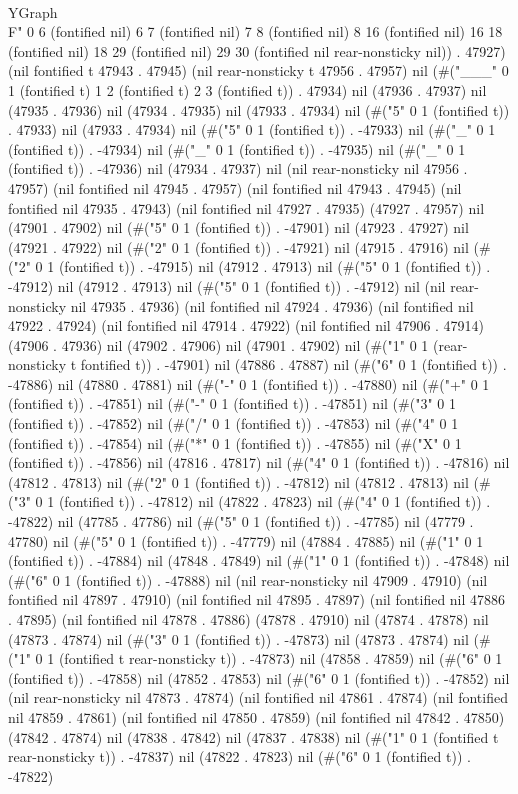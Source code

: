    \\YGraph\\F" 0 6 (fontified nil) 6 7 (fontified nil) 7 8 (fontified nil) 8 16 (fontified nil) 16 18 (fontified nil) 18 29 (fontified nil) 29 30 (fontified nil rear-nonsticky nil)) . 47927) (nil fontified t 47943 . 47945) (nil rear-nonsticky t 47956 . 47957) nil (#("___" 0 1 (fontified t) 1 2 (fontified t) 2 3 (fontified t)) . 47934) nil (47936 . 47937) nil (47935 . 47936) nil (47934 . 47935) nil (47933 . 47934) nil (#("5" 0 1 (fontified t)) . 47933) nil (47933 . 47934) nil (#("5" 0 1 (fontified t)) . -47933) nil (#("_" 0 1 (fontified t)) . -47934) nil (#("_" 0 1 (fontified t)) . -47935) nil (#("_" 0 1 (fontified t)) . -47936) nil (47934 . 47937) nil (nil rear-nonsticky nil 47956 . 47957) (nil fontified nil 47945 . 47957) (nil fontified nil 47943 . 47945) (nil fontified nil 47935 . 47943) (nil fontified nil 47927 . 47935) (47927 . 47957) nil (47901 . 47902) nil (#("5" 0 1 (fontified t)) . -47901) nil (47923 . 47927) nil (47921 . 47922) nil (#("2" 0 1 (fontified t)) . -47921) nil (47915 . 47916) nil (#("2" 0 1 (fontified t)) . -47915) nil (47912 . 47913) nil (#("5" 0 1 (fontified t)) . -47912) nil (47912 . 47913) nil (#("5" 0 1 (fontified t)) . -47912) nil (nil rear-nonsticky nil 47935 . 47936) (nil fontified nil 47924 . 47936) (nil fontified nil 47922 . 47924) (nil fontified nil 47914 . 47922) (nil fontified nil 47906 . 47914) (47906 . 47936) nil (47902 . 47906) nil (47901 . 47902) nil (#("1" 0 1 (rear-nonsticky t fontified t)) . -47901) nil (47886 . 47887) nil (#("6" 0 1 (fontified t)) . -47886) nil (47880 . 47881) nil (#("-" 0 1 (fontified t)) . -47880) nil (#("+" 0 1 (fontified t)) . -47851) nil (#("-" 0 1 (fontified t)) . -47851) nil (#("3" 0 1 (fontified t)) . -47852) nil (#("/" 0 1 (fontified t)) . -47853) nil (#("4" 0 1 (fontified t)) . -47854) nil (#("*" 0 1 (fontified t)) . -47855) nil (#("X" 0 1 (fontified t)) . -47856) nil (47816 . 47817) nil (#("4" 0 1 (fontified t)) . -47816) nil (47812 . 47813) nil (#("2" 0 1 (fontified t)) . -47812) nil (47812 . 47813) nil (#("3" 0 1 (fontified t)) . -47812) nil (47822 . 47823) nil (#("4" 0 1 (fontified t)) . -47822) nil (47785 . 47786) nil (#("5" 0 1 (fontified t)) . -47785) nil (47779 . 47780) nil (#("5" 0 1 (fontified t)) . -47779) nil (47884 . 47885) nil (#("1" 0 1 (fontified t)) . -47884) nil (47848 . 47849) nil (#("1" 0 1 (fontified t)) . -47848) nil (#("6" 0 1 (fontified t)) . -47888) nil (nil rear-nonsticky nil 47909 . 47910) (nil fontified nil 47897 . 47910) (nil fontified nil 47895 . 47897) (nil fontified nil 47886 . 47895) (nil fontified nil 47878 . 47886) (47878 . 47910) nil (47874 . 47878) nil (47873 . 47874) nil (#("3" 0 1 (fontified t)) . -47873) nil (47873 . 47874) nil (#("1" 0 1 (fontified t rear-nonsticky t)) . -47873) nil (47858 . 47859) nil (#("6" 0 1 (fontified t)) . -47858) nil (47852 . 47853) nil (#("6" 0 1 (fontified t)) . -47852) nil (nil rear-nonsticky nil 47873 . 47874) (nil fontified nil 47861 . 47874) (nil fontified nil 47859 . 47861) (nil fontified nil 47850 . 47859) (nil fontified nil 47842 . 47850) (47842 . 47874) nil (47838 . 47842) nil (47837 . 47838) nil (#("1" 0 1 (fontified t rear-nonsticky t)) . -47837) nil (47822 . 47823) nil (#("6" 0 1 (fontified t)) . -47822) 